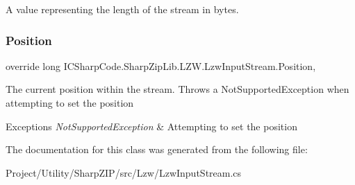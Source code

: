 A value representing the length of the stream in bytes. 

\mbox{\label{class_i_c_sharp_code_1_1_sharp_zip_lib_1_1_l_z_w_1_1_lzw_input_stream_a183217e4bc94ad385f11536c06c851bf}} 
\subsubsection{\texorpdfstring{Position}{Position}}
{\footnotesize\ttfamily override long I\+C\+Sharp\+Code.\+Sharp\+Zip\+Lib.\+L\+Z\+W.\+Lzw\+Input\+Stream.\+Position\hspace{0.3cm}{\ttfamily [get]}, {\ttfamily [set]}}



The current position within the stream. Throws a Not\+Supported\+Exception when attempting to set the position 


\begin{DoxyExceptions}{Exceptions}
{\em Not\+Supported\+Exception} & Attempting to set the position\\
\hline
\end{DoxyExceptions}


The documentation for this class was generated from the following file\+:\begin{DoxyCompactItemize}
\item 
Project/\+Utility/\+Sharp\+Z\+I\+P/src/\+Lzw/Lzw\+Input\+Stream.\+cs\end{DoxyCompactItemize}
